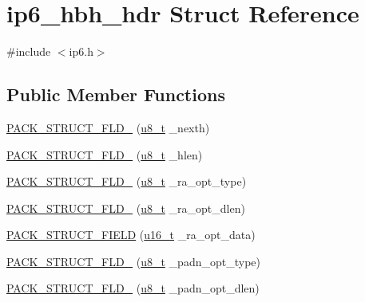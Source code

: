 \hypertarget{structip6__hbh__hdr}{}\section{ip6\+\_\+hbh\+\_\+hdr Struct Reference}
\label{structip6__hbh__hdr}


{\ttfamily \#include $<$ip6.\+h$>$}

\subsection*{Public Member Functions}
\begin{DoxyCompactItemize}
\item 
\hyperlink{structip6__hbh__hdr_a555a70b055779d096f51d359860ca93f}{P\+A\+C\+K\+\_\+\+S\+T\+R\+U\+C\+T\+\_\+\+F\+L\+D\+\_} (\hyperlink{group__compiler__abstraction_ga4caecabca98b43919dd11be1c0d4cd8e}{u8\+\_\+t} \+\_\+nexth)
\item 
\hyperlink{structip6__hbh__hdr_a0af943853d4729d00dc384e251669690}{P\+A\+C\+K\+\_\+\+S\+T\+R\+U\+C\+T\+\_\+\+F\+L\+D\+\_} (\hyperlink{group__compiler__abstraction_ga4caecabca98b43919dd11be1c0d4cd8e}{u8\+\_\+t} \+\_\+hlen)
\item 
\hyperlink{structip6__hbh__hdr_a42ffd2ead66ca2b9f2856afd26d471f6}{P\+A\+C\+K\+\_\+\+S\+T\+R\+U\+C\+T\+\_\+\+F\+L\+D\+\_} (\hyperlink{group__compiler__abstraction_ga4caecabca98b43919dd11be1c0d4cd8e}{u8\+\_\+t} \+\_\+ra\+\_\+opt\+\_\+type)
\item 
\hyperlink{structip6__hbh__hdr_abae41884e75c0d0b08ec9e16a19bf9b9}{P\+A\+C\+K\+\_\+\+S\+T\+R\+U\+C\+T\+\_\+\+F\+L\+D\+\_} (\hyperlink{group__compiler__abstraction_ga4caecabca98b43919dd11be1c0d4cd8e}{u8\+\_\+t} \+\_\+ra\+\_\+opt\+\_\+dlen)
\item 
\hyperlink{structip6__hbh__hdr_a5dff82e0d8756b04febd936e23b989da}{P\+A\+C\+K\+\_\+\+S\+T\+R\+U\+C\+T\+\_\+\+F\+I\+E\+LD} (\hyperlink{group__compiler__abstraction_ga77570ac4fcab86864fa1916e55676da2}{u16\+\_\+t} \+\_\+ra\+\_\+opt\+\_\+data)
\item 
\hyperlink{structip6__hbh__hdr_a3696ea1fb4f8f8bd3f5e18e6d0303cf6}{P\+A\+C\+K\+\_\+\+S\+T\+R\+U\+C\+T\+\_\+\+F\+L\+D\+\_} (\hyperlink{group__compiler__abstraction_ga4caecabca98b43919dd11be1c0d4cd8e}{u8\+\_\+t} \+\_\+padn\+\_\+opt\+\_\+type)
\item 
\hyperlink{structip6__hbh__hdr_afc8d541ae3a0368a9fb83f6f85a0d67e}{P\+A\+C\+K\+\_\+\+S\+T\+R\+U\+C\+T\+\_\+\+F\+L\+D\+\_} (\hyperlink{group__compiler__abstraction_ga4caecabca98b43919dd11be1c0d4cd8e}{u8\+\_\+t} \+\_\+padn\+\_\+opt\+\_\+dlen)

\end{DoxyCompactItemize}
